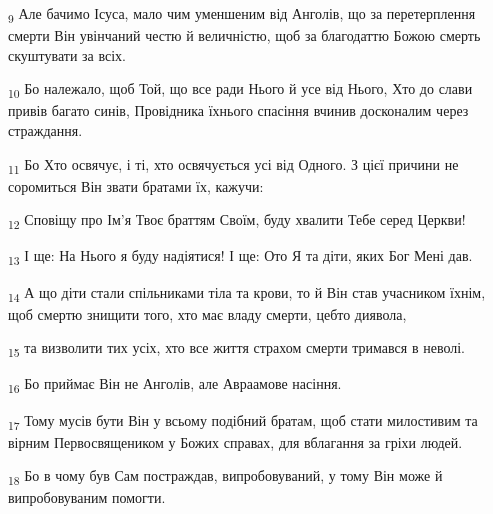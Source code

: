 \begin{tcolorbox}
\textsubscript{9} Але бачимо Ісуса, мало чим уменшеним від Анголів, що за перетерплення смерти Він увінчаний честю й величністю, щоб за благодаттю Божою смерть скуштувати за всіх.
\end{tcolorbox}
\begin{tcolorbox}
\textsubscript{10} Бо належало, щоб Той, що все ради Нього й усе від Нього, Хто до слави привів багато синів, Провідника їхнього спасіння вчинив досконалим через страждання.
\end{tcolorbox}
\begin{tcolorbox}
\textsubscript{11} Бо Хто освячує, і ті, хто освячується усі від Одного. З цієї причини не соромиться Він звати братами їх, кажучи:
\end{tcolorbox}
\begin{tcolorbox}
\textsubscript{12} Сповіщу про Ім'я Твоє браттям Своїм, буду хвалити Тебе серед Церкви!
\end{tcolorbox}
\begin{tcolorbox}
\textsubscript{13} І ще: На Нього я буду надіятися! І ще: Ото Я та діти, яких Бог Мені дав.
\end{tcolorbox}
\begin{tcolorbox}
\textsubscript{14} А що діти стали спільниками тіла та крови, то й Він став учасником їхнім, щоб смертю знищити того, хто має владу смерти, цебто диявола,
\end{tcolorbox}
\begin{tcolorbox}
\textsubscript{15} та визволити тих усіх, хто все життя страхом смерти тримався в неволі.
\end{tcolorbox}
\begin{tcolorbox}
\textsubscript{16} Бо приймає Він не Анголів, але Авраамове насіння.
\end{tcolorbox}
\begin{tcolorbox}
\textsubscript{17} Тому мусів бути Він у всьому подібний братам, щоб стати милостивим та вірним Первосвящеником у Божих справах, для вблагання за гріхи людей.
\end{tcolorbox}
\begin{tcolorbox}
\textsubscript{18} Бо в чому був Сам постраждав, випробовуваний, у тому Він може й випробовуваним помогти.
\end{tcolorbox}
